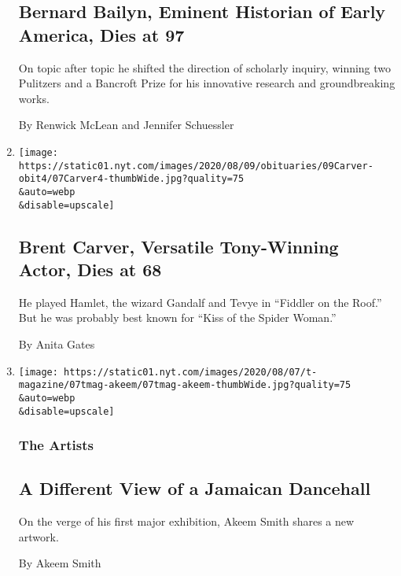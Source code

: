 \begin{enumerate}
  \hypertarget{bernard-bailyn-eminent-historian-of-early-america-dies-at-97}{%
  \subsection{Bernard Bailyn, Eminent Historian of Early America, Dies
  at
  97}\label{bernard-bailyn-eminent-historian-of-early-america-dies-at-97}}

  On topic after topic he shifted the direction of scholarly inquiry,
  winning two Pulitzers and a Bancroft Prize for his innovative research
  and groundbreaking works.

  By Renwick McLean and Jennifer Schuessler
\item
  \href{/2020/08/07/theater/brent-carver-dead.html}{}

  \texttt{[image: https://static01.nyt.com/images/2020/08/09/obituaries/09Carver-obit4/07Carver4-thumbWide.jpg?quality=75\\\&auto=webp\\\&disable=upscale]}

  \hypertarget{brent-carver-versatile-tony-winning-actor-dies-at-68}{%
  \subsection{Brent Carver, Versatile Tony-Winning Actor, Dies at
  68}\label{brent-carver-versatile-tony-winning-actor-dies-at-68}}

  He played Hamlet, the wizard Gandalf and Tevye in ``Fiddler on the
  Roof.'' But he was probably best known for ``Kiss of the Spider
  Woman.''

  By Anita Gates
\item
  \href{/2020/08/07/t-magazine/akeem-smith-art.html}{}

  \texttt{[image: https://static01.nyt.com/images/2020/08/07/t-magazine/07tmag-akeem/07tmag-akeem-thumbWide.jpg?quality=75\\\&auto=webp\\\&disable=upscale]}

  \hypertarget{the-artists}{%
  \subsubsection{The Artists}\label{the-artists}}

  \hypertarget{a-different-view-of-a-jamaican-dancehall}{%
  \subsection{A Different View of a Jamaican
  Dancehall}\label{a-different-view-of-a-jamaican-dancehall}}

  On the verge of his first major exhibition, Akeem Smith shares a new
  artwork.

  By Akeem Smith
\end{enumerate}

